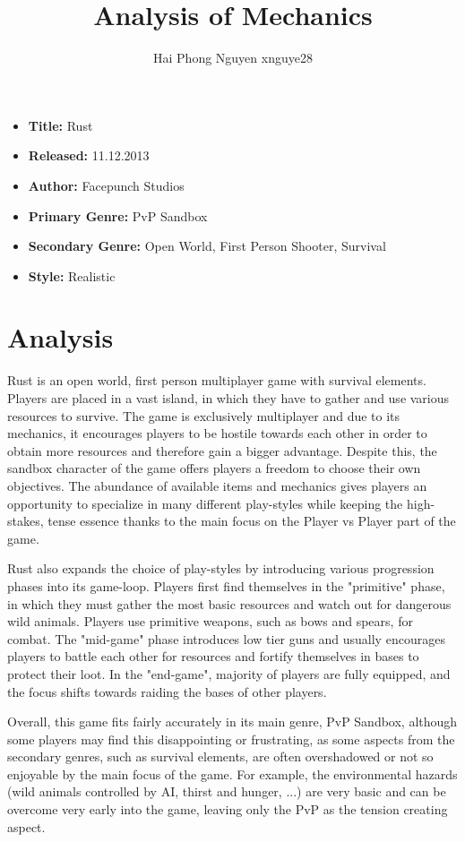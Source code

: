 \documentclass[a4paper,10pt,english]{article}
\title{%
Analysis of Mechanics%
}
\author{%
Hai Phong Nguyen xnguye28%
}
\date{}
\begin{document}
\maketitle
\thispagestyle{empty}

{%
\large

\begin{itemize}

\item[] \textbf{Title:} Rust

\item[] \textbf{Released:} 11.12.2013

\item[] \textbf{Author:} Facepunch Studios

\item[] \textbf{Primary Genre:} PvP Sandbox

\item[] \textbf{Secondary Genre:} Open World, First Person Shooter, Survival

\item[] \textbf{Style:} Realistic

\end{itemize}

}

\section*{\centering Analysis}
Rust is an open world, first person multiplayer game with survival elements. Players are placed in a vast island, in which they have to gather and use various resources to survive. The game is exclusively multiplayer and due to its mechanics, it encourages players to be hostile towards each other in order to obtain more resources and therefore gain a bigger advantage. Despite this, the sandbox character of the game offers players a freedom to choose their own objectives. The abundance of available items and mechanics gives players an opportunity to specialize in many different play-styles while keeping the high-stakes, tense essence thanks to the main focus on the Player vs Player part of the game.

Rust also expands the choice of play-styles by introducing various progression phases into its game-loop. Players first find themselves in the "primitive" phase, in which they must gather the most basic resources and watch out for dangerous wild animals. Players use primitive weapons, such as bows and spears, for combat. The "mid-game" phase introduces low tier guns and usually encourages players to battle each other for resources and fortify themselves in bases to protect their loot. In the "end-game", majority of players are fully equipped, and the focus shifts towards raiding the bases of other players.

Overall, this game fits fairly accurately in its main genre, PvP Sandbox, although some players may find this disappointing or frustrating, as some aspects from the secondary genres, such as survival elements, are often overshadowed or not so enjoyable by the main focus of the game. For example, the environmental hazards (wild animals controlled by AI, thirst and hunger, ...) are very basic and can be overcome very early into the game, leaving only the PvP as the tension creating aspect. 
\end{document}
